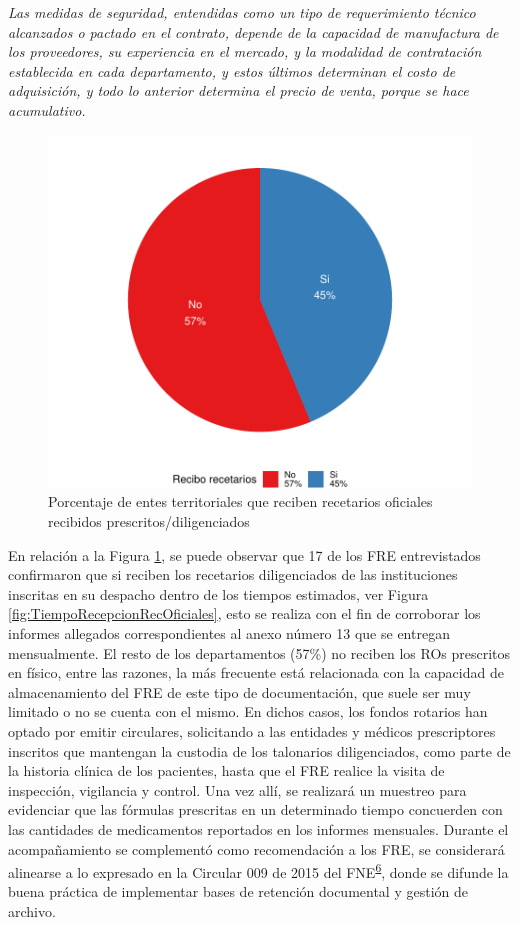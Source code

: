 \documentclass[
]{book}
\begin{document}
\emph{Las medidas de seguridad, entendidas como un tipo de requerimiento técnico alcanzados o pactado en el contrato, depende de la capacidad de manufactura de los proveedores, su experiencia en el mercado, y la modalidad de contratación establecida en cada departamento, y estos últimos determinan el costo de adquisición, y todo lo anterior determina el precio de venta, porque se hace acumulativo.}

\begin{figure}
\includegraphics[width=0.85\linewidth]{InformeFinal_files/figure-latex/ReciboRecetariosInstituciones-1} \caption{Porcentaje de entes territoriales que reciben recetarios oficiales recibidos prescritos/diligenciados}\label{fig:ReciboRecetariosInstituciones}
\end{figure}

En relación a la Figura \ref{fig:ReciboRecetariosInstituciones}, se puede observar que 17 de los FRE entrevistados confirmaron que si reciben los recetarios diligenciados de las instituciones inscritas en su despacho dentro de los tiempos estimados, ver Figura \ref{fig:TiempoRecepcionRecOficiales}, esto se realiza con el fin de corroborar los informes allegados correspondientes al anexo número 13 que se entregan mensualmente. El resto de los departamentos (57\%) no reciben los ROs prescritos en físico, entre las razones, la más frecuente está relacionada con la capacidad de almacenamiento del FRE de este tipo de documentación, que suele ser muy limitado o no se cuenta con el mismo. En dichos casos, los fondos rotarios han optado por emitir circulares, solicitando a las entidades y médicos prescriptores inscritos que mantengan la custodia de los talonarios diligenciados, como parte de la historia clínica de los pacientes, hasta que el FRE realice la visita de inspección, vigilancia y control. Una vez allí, se realizará un muestreo para evidenciar que las fórmulas prescritas en un determinado tiempo concuerden con las cantidades de medicamentos reportados en los informes mensuales. Durante el acompañamiento se complementó como recomendación a los FRE, se considerará alinearse a lo expresado en la Circular 009 de 2015 del FNE\textsuperscript{\protect\hyperlink{ref-FNE2015-9}{6}}, donde se difunde la buena práctica de implementar bases de retención documental y gestión de archivo.
\end{document}
